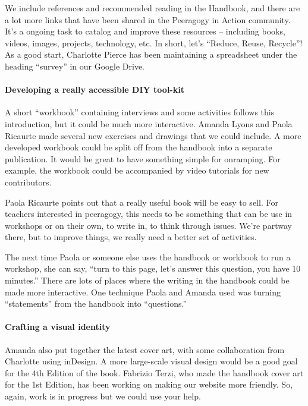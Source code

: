 We include references and recommended reading in the Handbook, and there
are a lot more links that have been shared in the Peeragogy in Action
community. It's a ongoing task to catalog and improve these resources --
including books, videos, images, projects, technology, etc. In short,
let's ``Reduce, Reuse, Recycle''! As a good start, Charlotte Pierce has
been maintaining a spreadsheet under the heading ``survey'' in our
Google Drive.

\hypertarget{developing-a-really-accessible-diy-tool-kit}{%
\paragraph{Developing a really accessible DIY
tool-kit}\label{developing-a-really-accessible-diy-tool-kit}}

A short ``workbook'' containing interviews and some activities follows
this introduction, but it could be much more interactive. Amanda Lyons
and Paola Ricaurte made several new exercises and drawings that we could
include. A more developed workbook could be split off from the handbook
into a separate publication. It would be great to have something simple
for onramping. For example, the workbook could be accompanied by video
tutorials for new contributors.

Paola Ricaurte points out that a really useful book will be easy to
sell. For teachers interested in peeragogy, this needs to be something
that can be use in workshops or on their own, to write in, to think
through issues. We're partway there, but to improve things, we really
need a better set of activities.

The next time Paola or someone else uses the handbook or workbook to run
a workshop, she can say, ``turn to this page, let's answer this
question, you have 10 minutes.'' There are lots of places where the
writing in the handbook could be made more interactive. One technique
Paola and Amanda used was turning ``statements'' from the handbook into
``questions.''

\hypertarget{crafting-a-visual-identity}{%
\paragraph{Crafting a visual identity}\label{crafting-a-visual-identity}}

Amanda also put together the latest cover art, with some collaboration
from Charlotte using inDesign. A more large-scale visual design would be
a good goal for the 4th Edition of the book. Fabrizio Terzi, who made
the handbook cover art for the 1st Edition, has been working on making
our website more friendly. So, again, work is in progress but we could
use your help.

